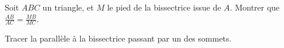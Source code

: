 \begin{exo}

Soit $ABC$ un triangle, et $M$ le pied de la bissectrice issue de $A$. Montrer que $\frac{AB}{AC}=\frac{MB}{MC}$.
\begin{center}
\end{center}
\begin{hint}
Tracer la parallèle à la bissectrice passant par un des sommets.
\end{hint}
\begin{sol}
\end{sol}
\end{exo}
